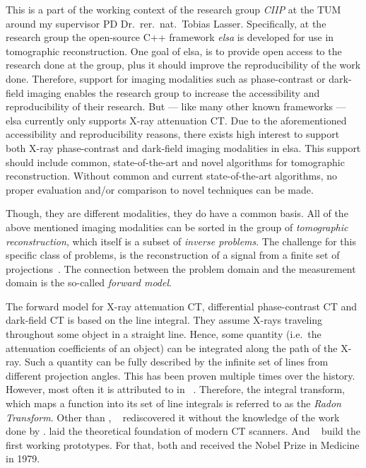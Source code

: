 This is a part of the working context of the research group \textit{\gls{CIIP}} at the \gls{TUM}
around my supervisor PD Dr.\ rer.\ nat.\ Tobias Lasser. Specifically, at the research group the
open-source C++ framework \textit{elsa} is developed for use in tomographic reconstruction. One goal
of elsa, is to provide open access to the research done at the group, plus it should improve the
reproducibility of the work done. Therefore, support for imaging modalities such as phase-contrast
or dark-field imaging enables the research group to increase the accessibility and reproducibility
of their research. But --- like many other known frameworks --- elsa currently only supports X-ray
attenuation CT\@. Due to the aforementioned accessibility and reproducibility reasons, there exists
high interest to support both X-ray phase-contrast and dark-field imaging modalities in elsa. This
support should include common, state-of-the-art and novel algorithms for tomographic reconstruction.
Without common and current state-of-the-art algorithms, no proper evaluation and/or comparison to
novel techniques can be made.

Though, they are different modalities, they do have a common basis. All of the above mentioned
imaging modalities can be sorted in the group of \textit{tomographic reconstruction}, which itself
is a subset of \textit{inverse problems}. The challenge for this specific class of problems, is the
reconstruction of a signal from a finite set of projections~\cite{herman_basis_2015}. The connection
between the problem domain and the measurement domain is the so-called \textit{forward model}.

The forward model for X-ray attenuation CT, differential phase-contrast CT and dark-field CT is
based on the line integral. They assume X-rays traveling throughout some object in a straight line.
Hence, some quantity (i.e.\ the attenuation coefficients of an object) can be integrated along the
path of the X-ray. Such a quantity can be fully described by the infinite set of lines from
different projection angles. This has been proven multiple times over the history. However, most
often it is attributed to \citeauthor*{radon_uber_1917} in \citeyear{radon_uber_1917}
~\cite{radon_uber_1917}. Therefore, the integral transform, which maps a function into its set of
line integrals is referred to as the \textit{Radon Transform}. Other than
\citeauthor*{radon_uber_1917},
\citeauthor*{cormack_representation_1963}~\cite{cormack_representation_1963} rediscovered it without
the knowledge of the work done by \citeauthor*{radon_uber_1917}.
\citeauthor*{cormack_representation_1963} laid the theoretical foundation of modern CT scanners. And
\citeauthor*{hounsfield_computerized_1973}~\cite{hounsfield_computerized_1973} build the first
working prototypes. For that, both \citeauthor*{cormack_representation_1963} and
\citeauthor*{hounsfield_computerized_1973} received the Nobel Prize in Medicine in 1979.

